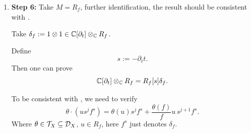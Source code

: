 \begin{example}
\begin{enumerate}
              In summary, we have
              \begin{align*}
                  \text{Block A: } & \quad g\cdot(\partial_t^\nu\otimes m) =\partial_t^\nu\otimes(gm),                                                                                         \\
                  \text{Block B: } & \quad \partial_{t}\cdot(\partial_t^\nu\otimes m) =\partial_t^{\nu+1}\otimes m,                                                                            \\
                  \text{Block C: } & \quad \partial_{x_i}^{(t)}\cdot(\partial_t^\nu\otimes m) =\partial_t^\nu\otimes(\partial_{x_i}m)-\partial_t^{\nu+1}\otimes\bigl((\partial_{x_i}f)m\bigr), \\
                  \text{Block D: } & \quad t\cdot(\partial_t^\nu\otimes m) =\partial_t^\nu\otimes fm-\nu\,\partial_t^{\nu-1}\otimes m,
              \end{align*}
              Which is consistent with \cite[discussion above Prop.~1.4]{Budur04}.

        \item \textbf{Step 6:} Take $M= R_f$, further identification, the result should be consistent with \cite[the $\D_X$-action on $B_{f,+}$]{Lee2025MultiplicativeThomSebastianiBSato_JAlgebra}.

              Take $\delta_f := 1\otimes 1\in \mathbb{C}[\partial_t]\otimes_{\mathbb{C}}R_f$.

              Define
              \[
                  s:=-\partial_t t.
              \]
              Then one can prove
              \[
                  \mathbb{C}[\partial_t]\otimes_{\mathbb{C}}R_f = R_f[s] \delta_f.
              \]

              To be consistent with \cite[the $\D_X$-action on $B_{f,+}$]{Lee2025MultiplicativeThomSebastianiBSato_JAlgebra},
              we need to verify
              \[
                  \theta\cdot(us^j f^s)
                  =\theta(u)s^j f^s+\frac{\theta(f)}{f}u\,s^{j+1}f^s.
              \]
              Where $\theta\in\mathcal{T}_X\subseteq\mathcal{D}_X$, $u\in R_f$, here $f^s$ just denotes $\delta_f$.



\end{enumerate}
\end{example}

